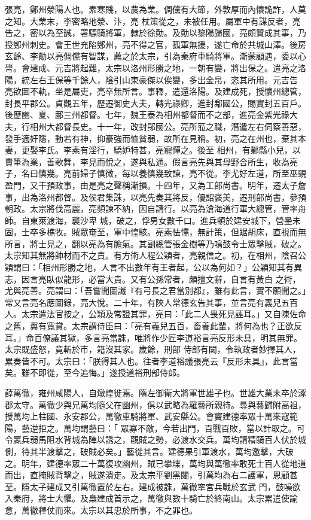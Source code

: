 \begin{pinyinscope}
 張亮，鄭州滎陽人也。素寒賤，以農為業。倜儻有大節，外敦厚而內懷詭詐，人莫之知。大業末，李密略地滎、汴，亮
 杖策從之，未被任用。屬軍中有謀反者，亮告之，密以為至誠，署驃騎將軍，隸於徐勣。及勣以黎陽歸國，亮頗贊成其事，乃授鄭州刺史。會王世充陷鄭州，亮不得之官，孤軍無援，遂亡命於共城山澤。後房玄齡、李勣以亮倜儻有智謀，薦之於太宗，引為秦府車騎將軍。漸蒙顧遇，委以心膂。會建成、元吉將起難，太宗以洛州形勝之地，一朝有變，將出保之。遣亮之洛陽，統左右王保等千餘人，陰引山東豪傑以俟變，多出金帛，恣其所用。元吉告
 亮欲圖不軌，坐是屬吏，亮卒無所言。事釋，遣還洛陽。及建成死，授懷州總管，封長平郡公。貞觀五年，歷遷御史大夫，轉光祿卿，進封鄅國公，賜實封五百戶。後歷豳、夏、鄜三州都督。七年，魏王泰為相州都督而不之部，進亮金紫光祿大夫，行相州大都督長史。十一年，改封鄖國公。亮所蒞之職，潛遣左右伺察善惡，發手適奸隱，動若有神，抑豪強而恤貧弱，故所在見稱。初，亮之在州也，棄其本妻，更娶李氏。李素有淫行，驕妒特甚，亮寵憚之。後至
 相州，有鄴縣小兒，以賣筆為業，善歌舞，李見而悅之，遂與私通。假言亮先與其母野合所生，收為亮子，名曰慎幾。亮前婦子慎微，每以養慎幾致諫，亮不從。李尤好左道，所至巫覡盈門，又干預政事，由是亮之聲稱漸損。十四年，又為工部尚書。明年，遷太子詹事，出為洛州都督。及侯君集誅，以亮先奏其將反，優詔褒美，遷刑部尚書，參預朝政。太宗將伐高麗，亮頻諫不納，因自請行。以亮為滄海道行軍大總管，管率舟師。自東萊渡海，襲沙卑
 城，破之，俘男女數千口。進兵頓於建安城下，營壘未固，士卒多樵牧。賊眾奄至，軍中惶駭。亮素怯懦，無計策，但踞胡床，直視而無所言，將士見之，翻以亮為有膽氣。其副總管張金樹等乃鳴鼓令士眾擊賊，破之。太宗知其無將帥材而不之責。有方術人程公穎者，亮親信之。初，在相州，陰召公穎謂曰：「相州形勝之地，人言不出數年有王者起，公以為何如？」公穎知其有異志，因言亮臥似龍形，必當大貴。又有公孫常者，頗擅文辭，自言有黃白
 之術，尤與亮善。亮謂曰：「吾嘗聞圖讖『有弓長之君當別都』，雖有此言，實不願聞之。」常又言亮名應圖錄，亮大悅。二十年，有陜人常德玄告其事，並言亮有義兒五百人。太宗遣法官按之，公穎及常證其罪，亮曰：「此二人畏死見誣耳。」又自陳佐命之舊，冀有寬貸。太宗謂侍臣曰：「亮有義兒五百，畜養此輩，將何為也？正欲反耳。」命百僚議其獄，多言亮當誅，唯將作少匠李道裕言亮反形未具，明其無罪。太宗既盛怒，竟斬於市，籍沒其家。歲餘，刑部
 侍郎有闕，令執政者妙擇其人，累奏皆不可。太宗曰：「朕得其人也。往者李道裕議張亮云『反形未具』，此言當矣。雖不即從，至今追悔。」遂授道裕刑部侍郎。



 薛萬徹，雍州咸陽人，自燉煌徙焉。隋左御衛大將軍世雄子也。世雄大業末卒於涿郡太守。萬徹少與兄萬均隨父在幽州，俱以武略為羅藝所親待。尋與藝歸附高祖，授萬均上柱國、永安郡公，萬徹車騎將軍、武安縣公。會竇建德率眾十萬來寇範陽，藝逆拒之。萬均謂藝曰：「
 眾寡不敵，今若出門，百戰百敗，當以計取之。可令羸兵弱馬阻水背城為陣以誘之，觀賊之勢，必渡水交兵。萬均請精騎百人伏於城側，待其半渡擊之，破賊必矣。」藝從其言。建德果引軍渡水，萬均邀擊，大破之。明年，建德率眾二十萬復攻幽州，賊已攀堞，萬均與萬徹率敢死士百人從地道而出，直掩賊背擊之，賊遂潰走。及太宗平劉黑闥，引萬均為右二護軍，恩顧甚至。隱太子建成又引萬徹置於左右。建成被誅，萬徹率宮兵戰於玄武
 門，鼓噪欲入秦府，將士大懼。及梟建成首示之，萬徹與數十騎亡於終南山。太宗累遣使諭意，萬徹釋仗而來。太宗以其忠於所事，不之罪也。




\end{pinyinscope}
